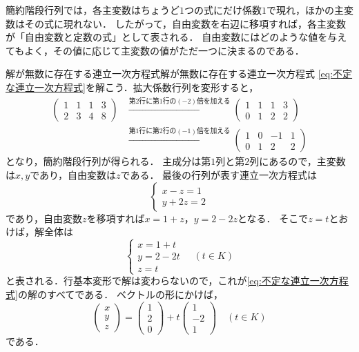 簡約階段行列では，各主変数はちょうど$1$つの式にだけ係数$1$で現れ，ほかの主変数はその式に現れない．
したがって，自由変数を右辺に移項すれば，各主変数が「自由変数と定数の式」として表される．
自由変数にはどのような値を与えてもよく，その値に応じて主変数の値がただ一つに決まるのである．

\begin{example}{解が無数に存在する連立一次方程式}{解が無数に存在する連立一次方程式}
  \eqref{eq:不定な連立一次方程式}を解こう．拡大係数行列を変形すると，
  \begin{align*}
    \left(
    \begin{array}{ccc|c}
      1 & 1 & 1 & 3 \\
      2 & 3 & 4 & 8
    \end{array}
    \right)
    &\xrightarrow{\text{第2行に第1行の$(-2)$倍を加える}}
    \left(
    \begin{array}{ccc|c}
      1 & 1 & 1 & 3 \\
      0 & 1 & 2 & 2
    \end{array}
    \right) \\
    &\xrightarrow{\text{第1行に第2行の$(-1)$倍を加える}}
    \left(
    \begin{array}{ccc|c}
      1 & 0 & -1 & 1 \\
      0 & 1 & 2 & 2
    \end{array}
    \right)
  \end{align*}
  となり，簡約階段行列が得られる．
  主成分は第$1$列と第$2$列にあるので，主変数は$x,y$であり，自由変数は$z$である．
  最後の行列が表す連立一次方程式は
  \[
    \begin{cases}
      x - z = 1 \\
      y + 2z = 2
    \end{cases}
  \]
  であり，自由変数$z$を移項すれば$x = 1 + z$，$y = 2 - 2z$となる．
  そこで$z = t$とおけば，解全体は
  \[
    \boxed{
    \begin{cases}
      x = 1 + t \\
      y = 2 - 2t \\
      z = t
    \end{cases}
    \quad (t \in K)
    }
  \]
  と表される．行基本変形で解は変わらないので，これが\eqref{eq:不定な連立一次方程式}の解のすべてである．
  ベクトルの形にかけば，
  \[
    \begin{pmatrix} x \\ y \\ z \end{pmatrix}
    = \begin{pmatrix} 1 \\ 2 \\ 0 \end{pmatrix}
    + t \begin{pmatrix} 1 \\ -2 \\ 1 \end{pmatrix}
    \quad (t \in K)
  \]
  である．
\end{example}

